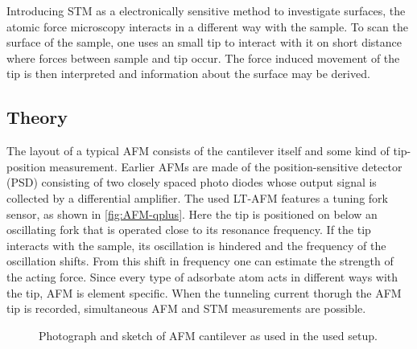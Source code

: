 Introducing STM as a electronically sensitive method to investigate surfaces, the atomic force microscopy interacts in a different way with the sample. To scan the surface of the sample, one uses an small tip to interact with it on short distance where forces between sample and tip occur. The force induced movement of the tip is then interpreted and information about the surface may be derived.
\subsection{Theory}
The layout of a typical  AFM consists of the cantilever itself and some kind of tip-position measurement. Earlier AFMs are made of the position-sensitive detector (PSD) consisting of two closely spaced photo diodes whose output signal is collected by a differential amplifier. The used LT-AFM features a tuning fork sensor, as shown in \autoref{fig:AFM-qplus}. Here the tip is positioned on below an oscillating fork that is operated close to its resonance frequency. If the tip interacts with the sample, its oscillation is hindered and the frequency of the oscillation shifts. From this shift in frequency one can estimate the strength of the acting force. Since every type of adsorbate atom acts in different ways with the tip, AFM is element specific. When the tunneling current thorugh the AFM tip is recorded, simultaneous AFM and STM measurements are possible. 

\begin{figure}\centering
\caption{Photograph  and sketch  of AFM cantilever as used in the used setup.}
\label{fig:AFM-tuning-fork}
\end{figure}	


